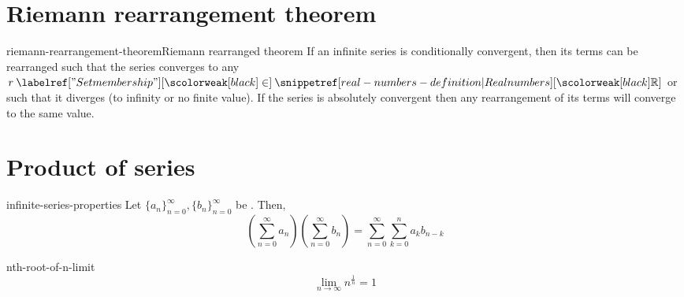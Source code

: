 \documentclass[preview]{standalone}
\begin{document}
\section{Riemann rearrangement theorem}

\begin{snippettheorem}{riemann-rearrangement-theorem}{Riemann rearranged theorem}
    If an infinite series is conditionally convergent, then its terms can be rearranged such that
    the series converges to any \(r\in \realnumbers\) or such that it diverges (to infinity or no finite value).
    If the series is absolutely convergent then any rearrangement of its terms will converge to the same value.
\end{snippettheorem}

\section{Product of series}

\begin{snippettheorem}{infinite-series-properties}{}
    Let \(\{a_n\}_{n=0}^\infty, \{b_n\}_{n=0}^\infty\) be \sequence[sequences].
    Then,
    \[
        \left(
            \sum_{n=0}^\infty a_n
        \right)
        \left(
            \sum_{n=0}^\infty b_n
        \right)
        =
        \sum_{n=0}^\infty \sum_{k=0}^n a_k b_{n-k}
    \]
\end{snippettheorem}

\begin{snippetproposition}{nth-root-of-n-limit}{}
    \[ \lim_{n \to \infty} n^{\frac{1}{n}} = 1 \]
\end{snippetproposition}
\end{document}
